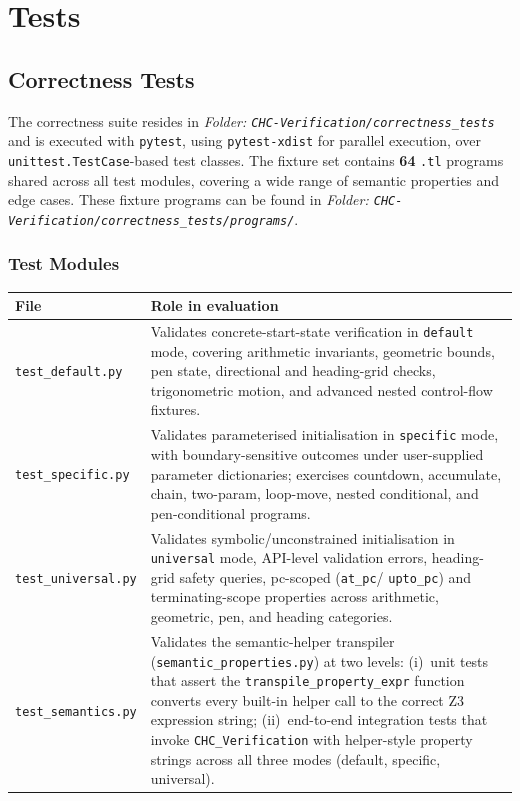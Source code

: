 \section*{Tests}
\label{sec:tests}

\subsection*{Correctness Tests}\label{subsec:correctness_tests}

The correctness suite resides in \noindent\textit{\small Folder: \texttt{CHC-Verification/correctness\_tests}} and is executed with
\texttt{pytest}, using \texttt{pytest-xdist} for parallel execution, over \texttt{unittest.TestCase}-based test classes.  The fixture set contains
\textbf{64} \texttt{.tl} programs shared across all test modules, covering a wide range of semantic
properties and edge cases.  These fixture programs can be found in
\noindent\textit{\small Folder: \texttt{CHC-Verification/correctness\_tests/programs/}}.
\subsubsection*{Test Modules}

\begin{longtable}{p{} p{}}
\toprule
\textbf{File} & \textbf{Role in evaluation} \\
\midrule
\endhead
\bottomrule
\endlastfoot
\texttt{test\_default.py}   & Validates concrete-start-state verification in \texttt{default} mode,
  covering arithmetic invariants, geometric bounds, pen state, directional and heading-grid checks,
  trigonometric motion, and advanced nested control-flow fixtures. \\[4pt]
\texttt{test\_specific.py}  & Validates parameterised initialisation in \texttt{specific} mode, with
  boundary-sensitive outcomes under user-supplied parameter dictionaries; exercises countdown,
  accumulate, chain, two-param, loop-move, nested conditional, and pen-conditional programs. \\[4pt]
\texttt{test\_universal.py} & Validates symbolic/unconstrained initialisation in \texttt{universal}
  mode, API-level validation errors, heading-grid safety queries, pc-scoped (\texttt{at\_pc}/
  \texttt{upto\_pc}) and terminating-scope properties across arithmetic, geometric, pen, and heading
  categories. \\[4pt]
\texttt{test\_semantics.py} & Validates the semantic-helper transpiler
  (\texttt{semantic\_properties.py}) at two levels: (i)~unit tests that assert the
  \texttt{transpile\_property\_expr} function converts every built-in helper call to the correct Z3
  expression string; (ii)~end-to-end integration tests that invoke \texttt{CHC\_Verification} with
  helper-style property strings across all three modes (default, specific, universal). \\[4pt]
\end{longtable}

